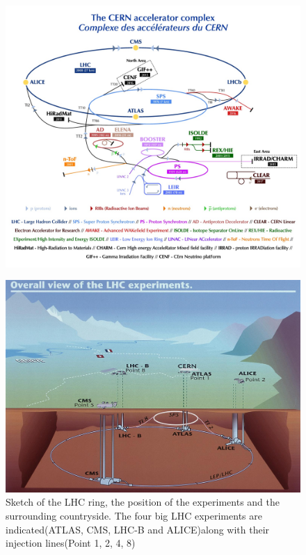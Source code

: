 \begin{figure}[htbp]
\centering
\includegraphics[width=\figwidth]{figures_LHC/CCC-v2018-print-v2.jpg}
\caption{\cite{Mobs:2636343}}
\label{fig:accelerator_complex}
\end{figure}

\begin{figure}
  \centering
  \includegraphics[scale=0.4]{figures_LHC/CERN-all-experiments.jpg}
  \caption[Sketch of the LHC ring.]{Sketch of the LHC ring, the position
    of the experiments and the surrounding countryside. The four big
    LHC experiments are indicated(ATLAS, CMS, LHC-B and ALICE)along with their injection lines(Point 1, 2, 4, 8)\cite{Jean-Luc:841555}}
  \label{fig:LHC}
\end{figure}


